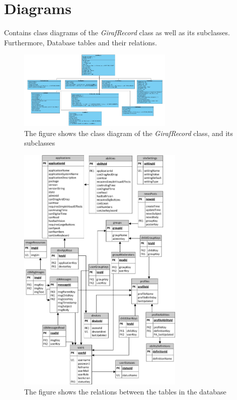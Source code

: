 \chapter{Diagrams}
\label{diagramAppendix}
Contains class diagrams of the \emph{GirafRecord} class as well as its subclasses. Furthermore, Database tables and their relations.
\begin{figure}[!ht]
\centering
\includegraphics[angle=90,width=280px]{img/classdiagram_Fixed.jpg}
\caption{The figure shows the class diagram of the \emph{GirafRecord} class, and its subclasses}
\label{fig:diagram}
\end{figure}

\begin{figure}[!ht]
\centering
\includegraphics[angle=0,width=300px]{img/ER-relation(1).jpg}
\caption{The figure shows the relations between the tables in the database}
\label{fig:database_relations}
\end{figure}
